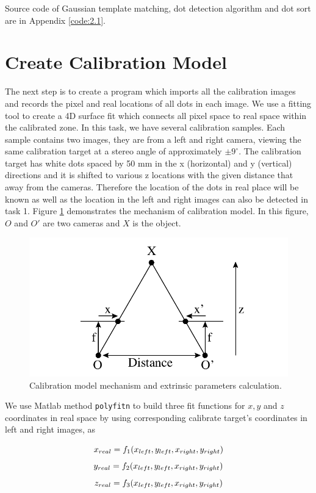 Source code of Gaussian template matching, dot detection algorithm and dot sort are in Appendix \ref{code:2.1}.

\section{Create Calibration Model}

The next step is to create a program which imports all the calibration images and records the pixel and real locations of all dots in each image. We use a fitting tool to create a 4D surface fit which connects all pixel space to real space within the calibrated zone. In this task, we have several calibration samples. Each sample contains two images, they are from a left and right camera, viewing the same calibration target at a stereo angle of approximately $\pm9^{\circ}$. The calibration target has white dots spaced by 50 mm in the x (horizontal) and y (vertical) directions and it is shifted to various z locations with the given distance that away from the cameras. Therefore the location of the dots in real place will be known as well as the location in the left and right images can also be detected in task 1. Figure \ref{fig:extrinsic} demonstrates the mechanism of calibration model. In this figure, $O$ and $O'$ are two cameras and $X$ is the object.

\begin{figure}[h!]
	\centering
	\includegraphics[width=0.6\linewidth]{figures/part2/extrinsic}
	\caption{Calibration model mechanism and extrinsic parameters calculation.}
	\label{fig:extrinsic}
\end{figure}

We use Matlab method \texttt{polyfitn} to build three fit functions for $x,y$ and $z$ coordinates in real space by using corresponding calibrate target's coordinates in left and right images, as

\begin{equation*}
	\centering
	x_{real} = f_{1}(x_{left}, y_{left}, x_{right}, y_{right}) 
\end{equation*}
\begin{equation*}
	\centering
	y_{real} = f_{2}(x_{left}, y_{left}, x_{right}, y_{right}) 
\end{equation*}
\begin{equation*}
	\centering
	z_{real} = f_{3}(x_{left}, y_{left}, x_{right}, y_{right}) 
\end{equation*}

